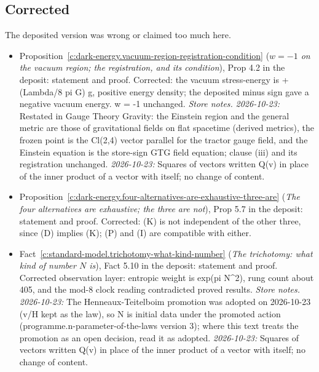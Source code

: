 \documentclass[11pt]{article}
\theoremstyle{definition}
\theoremstyle{plain}
\begin{document}
\subsection*{Corrected}
The deposited version was wrong or claimed too much here.
\begin{itemize}\setlength{\itemsep}{2pt}
\item Proposition~\ref{c:dark-energy.vacuum-region-registration-condition} (\emph{$w = -1$ on the vacuum region; the registration, and its condition}), Prop 4.2 in the deposit: statement and proof. Corrected: the vacuum stress-energy is +(Lambda/8 pi G) g, positive energy density; the deposited minus sign gave a negative vacuum energy. w = -1 unchanged. \emph{Store notes.} \emph{2026-10-23:} Restated in Gauge Theory Gravity: the Einstein region and the general metric are those of gravitational fields on flat spacetime (derived metrics), the frozen point is the Cl(2,4) vector parallel for the tractor gauge field, and the Einstein equation is the store-sign GTG field equation; clause (iii) and its registration unchanged. \emph{2026-10-23:} Squares of vectors written Q(v) in place of the inner product of a vector with itself; no change of content.
\item Proposition~\ref{c:dark-energy.four-alternatives-are-exhaustive-three-are} (\emph{The four alternatives are exhaustive; the three are not}), Prop 5.7 in the deposit: statement and proof. Corrected: (K) is not independent of the other three, since (D) implies (K); (P) and (I) are compatible with either.
\item Fact~\ref{c:standard-model.trichotomy-what-kind-number} (\emph{The trichotomy: what kind of number $N$ is}), Fact 5.10 in the deposit: statement and proof. Corrected observation layer: entropic weight is exp(pi N\^{}2), rung count about 405, and the mod-8 clock reading contradicted proved results. \emph{Store notes.} \emph{2026-10-23:} The Henneaux-Teitelboim promotion was adopted on 2026-10-23 (v/H kept as the law), so N is initial data under the promoted action (programme.n-parameter-of-the-laws version 3); where this text treats the promotion as an open decision, read it as adopted. \emph{2026-10-23:} Squares of vectors written Q(v) in place of the inner product of a vector with itself; no change of content.
\end{itemize}
\end{document}
